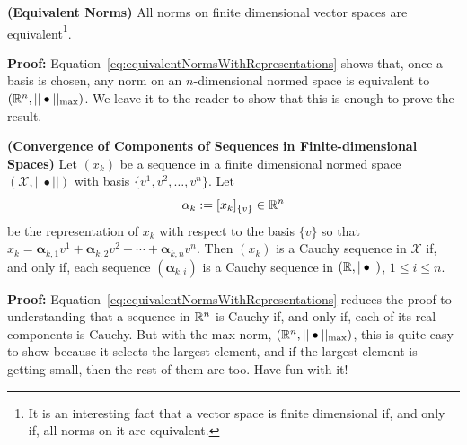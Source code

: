 \begin{cor} \textbf{(Equivalent Norms)} All norms on finite dimensional vector spaces are equivalent\footnote{It is an interesting fact that a vector space is finite dimensional if, and only if, all norms on it are equivalent.}.
\end{cor}

\textbf{Proof:} Equation~\eqref{eq:equivalentNormsWithRepresentations} shows that, once a basis is chosen, any norm on an $n$-dimensional normed space is equivalent to $(\mathbb R^n, ||\bullet||_{\rm max})$. We leave it to the reader to show that this is enough to prove the result. 
\Qed

\begin{cor} \textbf{(Convergence of Components of Sequences in Finite-dimensional Spaces)}
\label{cor:Reduce2Reals}
Let $(x_k)$ be a sequence in a finite dimensional normed space $(\mathcal{X}, ||  \bullet ||)$ with basis $\{v^1, v^2, \ldots, v^n \}$. Let $$\mathbf{\alpha}_k:=[x_k]_{\{v\}} \in \mathbb R^n$$
be the representation of $x_k$ with respect to the basis $\{v\}$ so that 
$x_k =  \mathbf{\alpha}_{k,1} v^1+ \mathbf{\alpha}_{k,2} v^2 + \cdots + \mathbf{\alpha}_{k,n} v^n. $ Then $(x_k)$ is a Cauchy sequence in $\mathcal{X}$ if, and only if, each sequence $(\mathbf{\alpha}_{k,i})$ is a Cauchy sequence in $(\mathbb R, |\bullet |)$, $1 \le i \le n$.
\end{cor}

\textbf{Proof:} Equation~\eqref{eq:equivalentNormsWithRepresentations} reduces the proof to understanding that a sequence in $\mathbb R^n$ is Cauchy if, and only if, each of its real components is Cauchy. But with the max-norm, $(\mathbb R^n, ||\bullet||_{\rm max})$, this is quite easy to show because it selects the largest element, and if the largest element is getting small, then the rest of them are too. Have fun with it! 
\Qed

